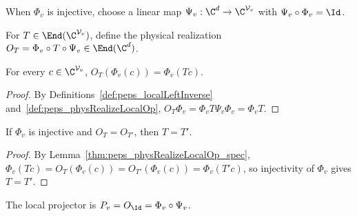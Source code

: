 \begin{definition}%
    \label{def:peps_localLeftInverse}
    \leanok
    When $\Phi_v$ is injective, choose a linear map
    $\Psi_v:\C^d\to\C^{\mathcal V_v}$ with $\Psi_v\circ\Phi_v=\Id$.
\end{definition}

\begin{definition}%
    \label{def:peps_physRealizeLocalOp}
    \leanok
    For $T\in\End(\C^{\mathcal V_v})$, define the physical realization
    $O_T=\Phi_v\circ T\circ\Psi_v\in\End(\C^d)$.
\end{definition}

\begin{lemma}%
    \label{thm:peps_physRealizeLocalOp_spec}
    \leanok
    For every $c\in\C^{\mathcal V_v}$, $O_T(\Phi_v(c))=\Phi_v(Tc)$.
\end{lemma}
\begin{proof}\leanok
    By Definitions~\ref{def:peps_localLeftInverse}
    and~\ref{def:peps_physRealizeLocalOp},
    $O_T\Phi_v=\Phi_vT\Psi_v\Phi_v=\Phi_vT$.
\end{proof}

\begin{lemma}%
    \label{thm:peps_physRealizeLocalOp_injective}
    \leanok
    If $\Phi_v$ is injective and $O_T=O_{T'}$, then $T=T'$.
\end{lemma}
\begin{proof}\leanok
    By Lemma~\ref{thm:peps_physRealizeLocalOp_spec},
    $\Phi_v(Tc)=O_T(\Phi_v(c))=O_{T'}(\Phi_v(c))=\Phi_v(T'c)$, so injectivity
    of $\Phi_v$ gives $T=T'$.
\end{proof}

\begin{definition}%
    \label{def:peps_localProjector}
    \leanok
    The local projector is $P_v=O_{\Id}=\Phi_v\circ\Psi_v$.
\end{definition}

